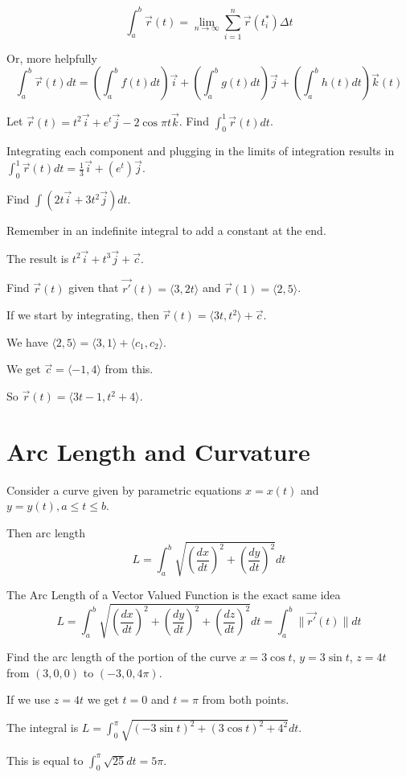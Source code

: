 \documentclass[../calc3.tex]{subfiles}
\begin{document}
\[ \int_a^b \vec{r}(t)=\lim_{n\to \infty}\sum_{i=1}^{n}\vec{r}(t_i^*)\Delta t \]

Or, more helpfully 
\[\int_a^b \vec{r}(t)dt = \left(\int_a^b f(t)dt\right)\vec{i}+\left(\int_a^b g(t)dt\right)\vec{j}+\left(\int_a^b h(t)dt\right)\vec{k}(t)\]

\begin{example}
    Let $\vec{r}(t)=t^2\vec{i}+e^t\vec{j}-2\cos\pi t\vec{k}$. Find $\int_0^1 \vec{r}(t)dt$.

    Integrating each component and plugging in the limits of integration results in $\int_0^1 \vec{r}(t)dt = \frac{1}{3}\vec{i}+(e^t)\vec{j}$.
\end{example}

\begin{example}
    Find $\int(2t\vec{i}+3t^2\vec{j})dt$.

    Remember in an indefinite integral to add a constant at the end.

    The result is $t^2\vec{i}+t^3\vec{j}+\vec{c}$.
\end{example}

\begin{example}
    Find $\vec{r}(t)$ given that $\vec{r'}(t)=\langle 3,2t\rangle$ and $\vec{r}(1)=\langle 2,5\rangle$.

    If we start by integrating, then $\vec{r}(t)=\langle 3t,t^2\rangle + \vec{c}$.

    We have $\langle 2,5\rangle = \langle 3,1\rangle+ \langle c_1,c_2\rangle$.

    We get $\vec{c}=\langle -1,4\rangle$ from this.

    So $\vec{r}(t)=\langle 3t-1, t^2+4\rangle$.
\end{example}

\section{Arc Length and Curvature}
Consider a curve given by parametric equations $x=x(t)$ and $y=y(t), a\leq t\leq b$.

Then arc length 
\[ L = \int_a^b \sqrt{\left(\frac{dx}{dt}\right)^2+\left(\frac{dy}{dt}\right)^2}dt \]

The Arc Length of a Vector Valued Function is the exact same idea 
\[ L = \int_a^b \sqrt{\left(\frac{dx}{dt}\right)^2 + \left(\frac{dy}{dt}\right)^2 + \left(\frac{dz}{dt}\right)^2}dt = \int_a^b \|\vec{r'}(t)\|dt \]

\begin{example}
    Find the arc length of the portion of the curve $x=3\cos t$, $y=3\sin t$, $z=4t$ from $(3,0,0)$ to $(-3,0,4\pi)$.

    If we use $z=4t$ we get $t=0$ and $t=\pi$ from both points.

    The integral is $L=\int_0^{\pi}\sqrt{(-3\sin t)^2+(3\cos t)^2+4^2}dt$.

    This is equal to $\int_0^{\pi}\sqrt{25}dt = 5\pi$.
\end{example}
\end{document}
